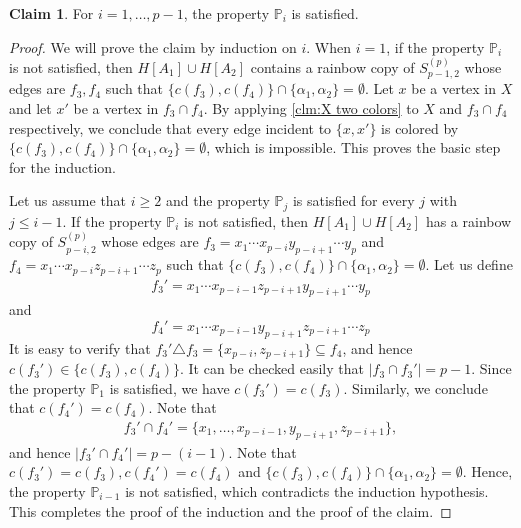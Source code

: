 \documentclass[10pt,a4paper]{article}
\theoremstyle{definition}
\newtheorem{claim}[theorem]{Claim}
\newcommand{\PP}{\mathbb{P}}
\newcommand{\cH}{\mathcal{H}}
\begin{document}
\begin{claim}\label{clm:disjoint}
    For $i=1,\ldots, p-1$, the property $\PP_i$ is satisfied.
\end{claim}
\begin{proof}
    We will prove the claim by induction on $i$.
    When $i=1$, if the property $\PP_i$ is not satisfied, then $H[A_1]\cup H[A_2]$ contains a rainbow copy of $S^{(p)}_{p-1,2}$ whose edges are $f_3,f_4$ such that $\{c(f_3),c(f_4)\}\cap \{\alpha_1,\alpha_2\}=\emptyset$.
    Let $x$ be a vertex in $X$ and let $x'$ be a vertex in $f_3\cap f_4$.
    By applying \cref{clm:X two colors} to $X$ and $f_3\cap f_4$ respectively, we conclude that every edge incident to $\{x,x'\}$ is colored by $\{c(f_3),c(f_4)\}\cap \{\alpha_1,\alpha_2\}=\emptyset$, which is impossible.
    This proves the basic step for the induction.

    Let us assume that $i\ge2$ and the property $\PP_{j}$ is satisfied for every $j$ with $j\le i-1$.
    If the property $\PP_{i}$ is not satisfied, then $H[A_1]\cup H[A_2]$ has a rainbow copy of $S^{(p)}_{p-i,2}$ whose edges are $f_3=x_1\cdots x_{p-i} y_{p-i+1}\cdots y_p$ and $f_4=x_1\cdots x_{p-i} z_{p-i+1}\cdots z_p$ such that $\{c(f_3),c(f_4)\}\cap \{\alpha_1,\alpha_2\}=\emptyset$.
    Let us define
    \begin{align}
        f_3'=x_1\cdots x_{p-i-1}z_{p-i+1}y_{p-i+1}\cdots y_p
    \end{align}
    and
    \[
        f_4'=x_1\cdots x_{p-i-1}y_{p-i+1}z_{p-i+1}\cdots z_{p}
    \]
    It is easy to verify that $f_3'\triangle f_3=\{x_{p-i},z_{p-i+1}\}\subseteq f_4$, and hence $c(f_3')\in\{c(f_3),c(f_4)\}$.
    It can be checked easily that $|f_3\cap f_3'|=p-1$.
    Since the property $\PP_{1}$ is satisfied, we have $c(f_3')=c(f_3)$.
    Similarly, we conclude that $c(f_4')=c(f_4)$.
    Note that
    \begin{align}
        f_3'\cap f_4'=\{x_1,\ldots,x_{p-i-1},y_{p-i+1},z_{p-i+1}\},
    \end{align}
    and hence $|f_3'\cap f_4'|=p-(i-1)$.
    Note that $c(f_3')=c(f_3),c(f_4')=c(f_4)$ and $\{c(f_3),c(f_4)\}\cap \{\alpha_1,\alpha_2\}=\emptyset$.
    Hence, the property $\PP_{i-1}$ is not satisfied, which contradicts the induction hypothesis.
    This completes the proof of the induction and the proof of the claim.
\end{proof}
\end{document}
